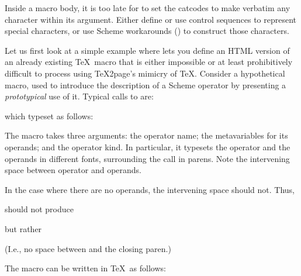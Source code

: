 {{{{{{{{{{{{{{Inside a macro body, it is too late for \p{\eval} to set the catcodes
to make verbatim any character within its argument.  Either define or
use control sequences to represent special characters, or use Scheme
workarounds () to construct those characters.

Let us first look at a simple example where
\p{\eval} lets you define an HTML version of an already
existing \TeX\ macro that is either impossible or at
least prohibitively difficult  to process using
\TeX2page's  mimicry of \TeX.  Consider a hypothetical
\p{\proto} macro, used to introduce the description of
a Scheme operator by presenting a {\em prototypical}
use of it.
Typical calls to \p{\proto} are:


\n which typeset as follows:

\quote


\endquote

\n The macro \p{\proto} takes three arguments: the
operator name; the metavariables for its operands;
and the operator kind.  In particular, it typesets
the operator and the operands in different fonts,
surrounding the call in parens.  Note the
intervening space between operator and operands.

In the case where there are no operands, the intervening
space should not.  Thus,


\n should not produce

\quote


\endquote

\n but rather

\quote


\endquote

\n (I.e., no space between  and the
closing paren.)


The \p{\proto} macro can be written
in \TeX\ as follows:


}}}}}}}}}}}}}}
